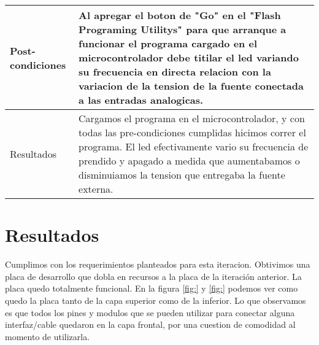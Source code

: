 \begin{table}[h]
\begin{tabular}{p{2cm} p{9cm}}
\hline

Post-condiciones &  Al apregar el boton de "Go" en el "Flash Programing Utilitys" para que arranque a funcionar el programa cargado en el microcontrolador debe titilar el led variando su frecuencia en directa relacion con la variacion de la tension de la fuente conectada a las entradas analogicas.
\\ 
\hline
Resultados       &  Cargamos el programa en el microcontrolador, y con todas las pre-condiciones cumplidas hicimos correr el programa. El led efectivamente vario su frecuencia de prendido y apagado a medida que aumentabamos o disminuiamos la tension que entregaba la fuente externa.                                                                                                             
\end{tabular}
\end{table}



\section{Resultados} %
\label{sec:resultados}

Cumplimos con los requerimientos planteados para esta iteracion. Obtivimos una placa de desarrollo que dobla en recursos a la placa de la iteración anterior. La placa quedo totalmente funcional.
En la figura \ref{fig:} y \ref{fig:} podemos ver como quedo la placa tanto de la capa superior como de la inferior. Lo que observamos es que todos los pines y modulos que se pueden utilizar para conectar alguna interfaz/cable quedaron en la capa frontal, por una cuestion de comodidad al momento de utilizarla.

